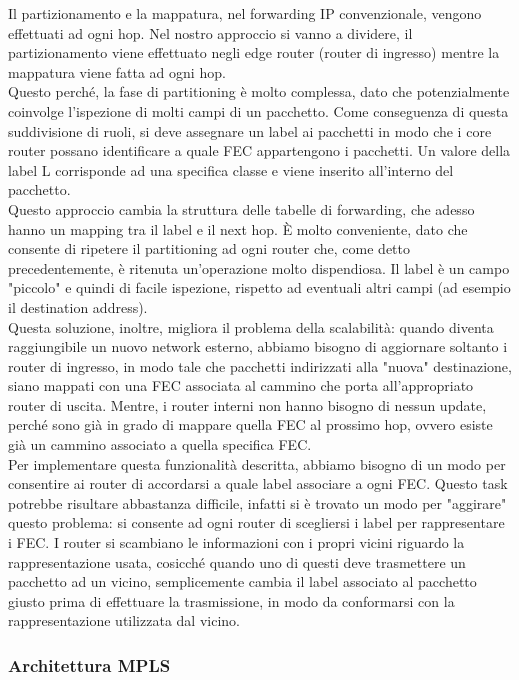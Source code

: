 \documentclass{article}
\begin{document}
Il partizionamento e la mappatura, nel forwarding IP convenzionale, vengono effettuati ad ogni hop. Nel nostro approccio si vanno a dividere, il partizionamento viene effettuato negli edge router (router di ingresso) mentre la mappatura viene fatta ad ogni hop. \\ Questo perché, la fase di partitioning è molto complessa, dato che potenzialmente coinvolge l'ispezione di molti campi di un pacchetto. Come conseguenza di questa suddivisione di ruoli, si deve assegnare un label ai pacchetti in modo che i core router possano identificare a quale FEC appartengono i pacchetti. Un valore della label L corrisponde ad una specifica classe e viene inserito all'interno del pacchetto. \\ Questo approccio cambia la struttura delle tabelle di forwarding, che adesso hanno un mapping tra il label e il next hop. È molto conveniente, dato che consente di ripetere il partitioning ad ogni router che, come detto precedentemente, è ritenuta un'operazione molto dispendiosa. Il label è un campo "piccolo" e quindi di facile ispezione, rispetto ad eventuali altri campi (ad esempio il destination address). \\ Questa soluzione, inoltre, migliora il problema della scalabilità: quando diventa raggiungibile un nuovo network esterno, abbiamo bisogno di aggiornare soltanto i router di ingresso, in modo tale che pacchetti indirizzati alla "nuova" destinazione, siano mappati con una FEC associata al cammino che porta all'appropriato router di uscita. Mentre, i router interni non hanno bisogno di nessun update, perché sono già in grado di mappare quella FEC al prossimo hop, ovvero esiste già un cammino associato a quella specifica FEC. \\ Per implementare questa funzionalità descritta, abbiamo bisogno di un modo per consentire ai router di accordarsi a quale label associare a ogni FEC. Questo task potrebbe risultare abbastanza difficile, infatti si è trovato un modo per "aggirare" questo problema: si consente ad ogni router di scegliersi i label per rappresentare i FEC. I router si scambiano le informazioni con i propri vicini riguardo la rappresentazione usata, cosicché quando uno di questi deve trasmettere un pacchetto ad un vicino, semplicemente cambia il label associato al pacchetto giusto prima di effettuare la trasmissione, in modo da conformarsi con la rappresentazione utilizzata dal vicino.

\subsubsection{Architettura MPLS}
\end{document}
